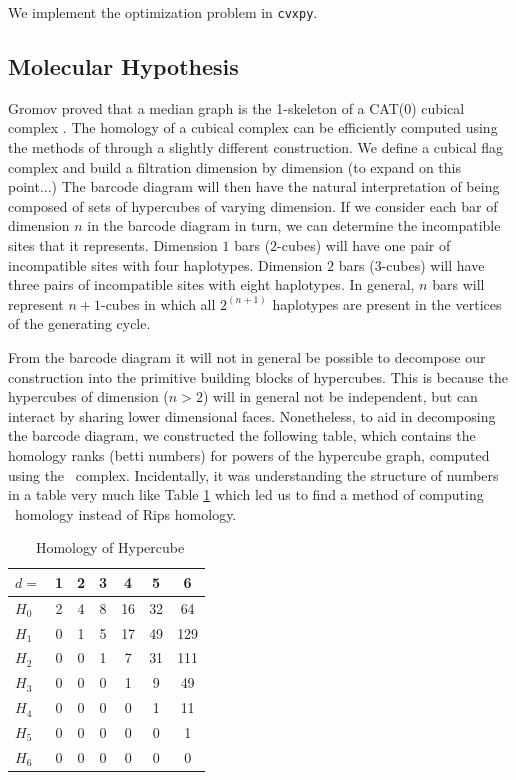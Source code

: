 We implement the optimization problem in \texttt{cvxpy}.

\subsection{Molecular Hypothesis}

Gromov proved that a median graph is the 1-skeleton of a CAT(0) cubical complex \citep{Gromov:1987}.
The homology of a cubical complex can be efficiently computed using the methods of \citet{Kaczynski:2004} through a slightly different construction.
We define a cubical flag complex and build a filtration dimension by dimension (to expand on this point...)
The barcode diagram will then have the natural interpretation of being composed of sets of hypercubes of varying dimension.
If we consider each bar of dimension $n$ in the barcode diagram in turn, we can determine the incompatible sites that it represents.
Dimension $1$ bars ($2$-cubes) will have one pair of incompatible sites with four haplotypes.
Dimension $2$ bars ($3$-cubes) will have three pairs of incompatible sites with eight haplotypes.
In general, $n$ bars will represent $n+1$-cubes in which all $2^{(n+1)}$ haplotypes are present in the vertices of the generating cycle.

From the barcode diagram it will not in general be possible to decompose our construction into the primitive building blocks of hypercubes.
This is because the hypercubes of dimension ($n>2$) will in general not be independent, but can interact by sharing lower dimensional faces.
Nonetheless, to aid in decomposing the barcode diagram, we constructed the following table, which contains the homology ranks (betti numbers) for powers of the hypercube graph, computed using the \Cech\ complex.
Incidentally, it was understanding the structure of numbers in a table very much like Table \ref{table:hypercube_homology} which led us to find a method of computing \Cech\ homology instead of Rips homology.

\begin{table}
\centering
\caption{\Cech\ Homology of Hypercube}
\begin{tabular}{lcccccc}
\toprule
$d=$    & 1 & 2 & 3 &  4 &  5 &   6\\
\midrule
$H_{0}$ & 2 & 4 & 8 & 16 & 32 &  64\\
$H_{1}$ & 0 & 1 & 5 & 17 & 49 & 129\\
$H_{2}$ & 0 & 0 & 1 &  7 & 31 & 111\\
$H_{3}$ & 0 & 0 & 0 &  1 &  9 &  49\\
$H_{4}$ & 0 & 0 & 0 &  0 &  1 &  11\\
$H_{5}$ & 0 & 0 & 0 &  0 &  0 &   1\\
$H_{6}$ & 0 & 0 & 0 &  0 &  0 &   0\\
\bottomrule
\end{tabular}
\label{table:hypercube_homology}
\end{table}

